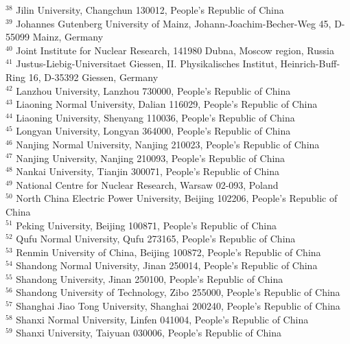 {{$^{38}$ Jilin University, Changchun 130012, People's Republic of China\\
$^{39}$ Johannes Gutenberg University of Mainz, Johann-Joachim-Becher-Weg 45, D-55099 Mainz, Germany\\
$^{40}$ Joint Institute for Nuclear Research, 141980 Dubna, Moscow region, Russia\\
$^{41}$ Justus-Liebig-Universitaet Giessen, II. Physikalisches Institut, Heinrich-Buff-Ring 16, D-35392 Giessen, Germany\\
$^{42}$ Lanzhou University, Lanzhou 730000, People's Republic of China\\
$^{43}$ Liaoning Normal University, Dalian 116029, People's Republic of China\\
$^{44}$ Liaoning University, Shenyang 110036, People's Republic of China\\
$^{45}$ Longyan University, Longyan 364000, People's Republic of China\\
$^{46}$ Nanjing Normal University, Nanjing 210023, People's Republic of China\\
$^{47}$ Nanjing University, Nanjing 210093, People's Republic of China\\
$^{48}$ Nankai University, Tianjin 300071, People's Republic of China\\
$^{49}$ National Centre for Nuclear Research, Warsaw 02-093, Poland\\
$^{50}$ North China Electric Power University, Beijing 102206, People's Republic of China\\
$^{51}$ Peking University, Beijing 100871, People's Republic of China\\
$^{52}$ Qufu Normal University, Qufu 273165, People's Republic of China\\
$^{53}$ Renmin University of China, Beijing 100872, People's Republic of China\\
$^{54}$ Shandong Normal University, Jinan 250014, People's Republic of China\\
$^{55}$ Shandong University, Jinan 250100, People's Republic of China\\
$^{56}$ Shandong University of Technology, Zibo 255000, People's Republic of China\\
$^{57}$ Shanghai Jiao Tong University, Shanghai 200240, People's Republic of China\\
$^{58}$ Shanxi Normal University, Linfen 041004, People's Republic of China\\
$^{59}$ Shanxi University, Taiyuan 030006, People's Republic of China\\
}}
